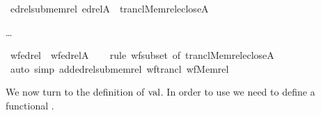 \begin{isabelle}
\isamarkupfalse%
\ edrel{\isacharunderscore}sub{\isacharunderscore}memrel{\isacharcolon}\ {\isachardoublequoteopen}edrel{\isacharparenleft}A{\isacharparenright}\ {\isasymsubseteq}\ trancl{\isacharparenleft}Memrel{\isacharparenleft}eclose{\isacharparenleft}A{\isacharparenright}{\isacharparenright}{\isacharparenright}{\isachardoublequoteclose}
\end{isabelle}
\dots
\begin{isabelle}
\isamarkupfalse%
\ wf{\isacharunderscore}edrel\ {\isacharcolon}\ {\isachardoublequoteopen}wf{\isacharparenleft}edrel{\isacharparenleft}A{\isacharparenright}{\isacharparenright}{\isachardoublequoteclose}\isanewline
\ \ \isamarkupfalse%
\ {\isacharparenleft}rule\ wf{\isacharunderscore}subset\ {\isacharbrackleft}of\ {\isachardoublequoteopen}trancl{\isacharparenleft}Memrel{\isacharparenleft}eclose{\isacharparenleft}A{\isacharparenright}{\isacharparenright}{\isacharparenright}{\isachardoublequoteclose}{\isacharbrackright}{\isacharparenright}\isanewline
\ \ \isamarkupfalse%
\ {\isacharparenleft}auto\ simp\ add{\isacharcolon}edrel{\isacharunderscore}sub{\isacharunderscore}memrel\ wf{\isacharunderscore}trancl\ wf{\isacharunderscore}Memrel{\isacharparenright}\isanewline
\ \ \isamarkupfalse%
%
\end{isabelle}

\noindent We now turn to the definition of $\operatorname{val}$. In order to use
 we need to define a functional .

